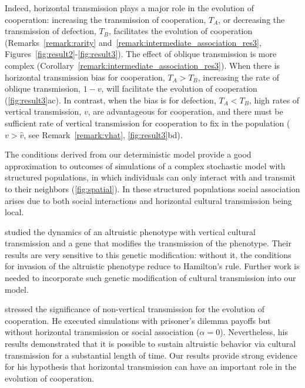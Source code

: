 \documentclass[12pt]{extarticle}
\begin{document}
Indeed, horizontal transmission plays a major role in the evolution of cooperation: increasing the transmission of cooperation, $T_A$, or decreasing the transmission of defection, $T_B$, facilitates the evolution of cooperation (Remarks~\ref{remark:rarity} and~\ref{remark:intermediate_association_res3}, Figures~\ref{fig:result2}-\ref{fig:result3}). 
The effect of oblique transmission is more complex (Corollary~\ref{remark:intermediate_association_res3}). 
When there is horizontal transmission bias for cooperation, $T_A>T_B$, increasing the rate of oblique transmission, $1-v$, will facilitate the evolution of cooperation (\autoref{fig:result3}ac).
In contrast, when the bias is for defection, $T_A<T_B$, high rates of vertical transmission, $v$, are advantageous for cooperation, and there must be sufficient rate of vertical transmission for cooperation to fix in the population ($v>\hat v$, see Remark~\autoref{remark:vhat}, \autoref{fig:result3}bd).

The conditions derived from our deterministic model provide a good approximation to outcomes of simulations of a complex stochastic model with structured populations, in which individuals can only interact with and transmit to their neighbors (\autoref{fig:spatial}).
In these structured populations social association arises due to both social interactions and horizontal cultural transmission being local.

\citet{feldman1985gene} studied the dynamics of an altruistic phenotype with vertical cultural transmission and a gene that modifies the transmission of the phenotype. Their results are very sensitive to this genetic modification: without it, the conditions for invasion of the altruistic phenotype reduce to Hamilton's rule.
Further work is needed to incorporate such genetic modification of cultural transmission into our model.

\citet{woodcock2006significance} stressed the significance of non-vertical transmission for the evolution of cooperation. He executed simulations with prisoner's dilemma payoffs but without horizontal transmission or social association ($\alpha=0$). Nevertheless, his results demonstrated that it is possible to sustain altruistic behavior via cultural transmission for a substantial length of time.
Our results provide strong evidence for his hypothesis that horizontal transmission can have an important role in the evolution of cooperation. 
\end{document}
